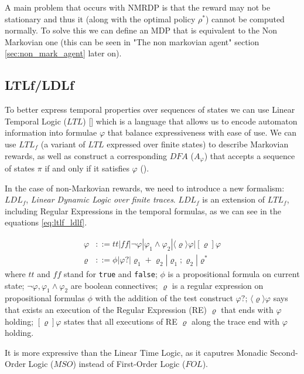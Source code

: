 \documentclass{article}
\begin{document}
A main problem that occurs with NMRDP is that the reward may not be stationary and thus it (along with the optimal policy $\rho^*$) cannot be computed normally. To solve this we can define an MDP that is equivalent to the Non Markovian one (this can be seen in "The non markovian agent" section \ref{sec:non_mark_agent} later on). \\

\subsection{LTLf/LDLf}%
To better express temporal properties over sequences of states we can use Linear Temporal Logic ($LTL$) [\cite{brafman2018ltlf_LTLF_LDLF}] which is a language that allows us to encode automaton information into formulae $\varphi$ that balance expressiveness with ease of use. We can use $LTL_f$ (a variant of $LTL$ expressed over finite states) to describe Markovian rewards, as well as construct a corresponding $DFA$ ($A_\varphi$) that accepts a sequence of states $\pi$ if and only if it satisfies $\varphi$ (\cite{camacho_chen_sanner_mcilraith_2017}).

In the case of non-Markovian rewards, we need to introduce a new formalism: $LDL_f$, \textit{Linear Dynamic Logic over finite traces}. $LDL_f$ is an extension of $LTL_f$, including Regular Expressions in the temporal formulas, as we can see in the equations \ref{eq:ltlf_ldlf}.

\begin{align}
    \varphi &::= tt|ff|\neg \varphi | \varphi_1 \wedge \varphi_2| \langle \varrho \rangle\varphi | [\varrho]\varphi \nonumber\\ 
    \varrho &::= \phi | \varphi? | \varrho_1 + \varrho_2 | \varrho_1 ; \varrho_2 | \varrho^* 
    \label{eq:ltlf_ldlf}
\end{align}
where $tt$ and $ff$ stand for \verb|true| and \verb|false|; $\phi$ is a propositional formula on current state; $\neg \varphi, \varphi_1 \wedge \varphi_2$ are boolean connectives; $\varrho$ is a regular expression on propositional formulas $\phi$ with the addition of the test construct $\varphi?$; $\langle \varrho \rangle\varphi$ says that exists an execution of the Regular Expression (RE) $\varrho$ that ends with $\varphi$ holding; $[\varrho]\varphi$ states that all executions of RE $\varrho$ along the trace end with $\varphi$ holding.

It is more expressive than the Linear Time Logic, as it caputres Monadic Second-Order Logic ($MSO$) instead of First-Order Logic ($FOL$).
\end{document}

